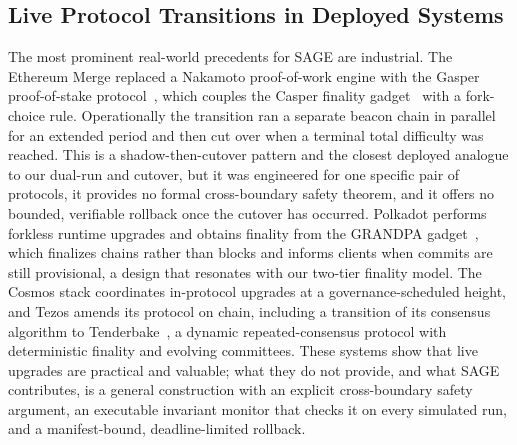 \documentclass[journal]{IEEEtran}
\begin{document}
\subsection{Live Protocol Transitions in Deployed Systems}
The most prominent real-world precedents for SAGE are industrial. The Ethereum Merge
replaced a Nakamoto proof-of-work engine with the Gasper proof-of-stake
protocol~\cite{gasper}, which couples the Casper finality gadget~\cite{casperffg} with a
fork-choice rule. Operationally the transition ran a separate beacon chain in parallel for
an extended period and then cut over when a terminal total difficulty was reached. This is a
shadow-then-cutover pattern and the closest deployed analogue to our dual-run and cutover,
but it was engineered for one specific pair of protocols, it provides no formal
cross-boundary safety theorem, and it offers no bounded, verifiable rollback once the cutover
has occurred. Polkadot performs forkless runtime upgrades and obtains finality from the
GRANDPA gadget~\cite{grandpa}, which finalizes chains rather than blocks and informs clients
when commits are still provisional, a design that resonates with our two-tier finality model.
The Cosmos stack coordinates in-protocol upgrades at a governance-scheduled height, and Tezos
amends its protocol on chain, including a transition of its consensus algorithm to
Tenderbake~\cite{tenderbake}, a dynamic repeated-consensus protocol with deterministic
finality and evolving committees. These systems show that live upgrades are practical and
valuable; what they do not provide, and what SAGE contributes, is a general construction with
an explicit cross-boundary safety argument, an executable invariant monitor that checks it on
every simulated run, and a manifest-bound, deadline-limited rollback.
\end{document}

